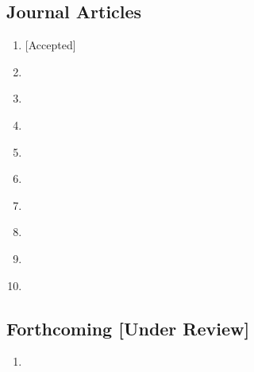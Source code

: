 \documentclass{my_cv}%
\begin{document}
\subsection{\faFileTextO \hspace{0.5em}\bfseries Journal Articles}
\vspace{1em}
\begin{enumerate}
\setlength\itemsep{-0.1em}
\color{mygray}
 \item {} [Accepted]\cite{Surendra2020}
 \item {} \cite{Sreedhar2020}
 \item {} \cite{Saini2020}
 \item {} \cite{puthiyaveettil2020}
 \item {} \cite{Nithin2019}
 \item {} \cite{maierhofer2018}
 \item {} \cite{unnikrishnakurup2017}
 \item {} \cite{thomas2017}
 \item {} \cite{sreedhar2016}
 \item {} \cite{sreedhar2012}
\end{enumerate}

\subsection{\faFileTextO \hspace{0.5em}\bfseries Forthcoming [Under Review]}
\vspace{1em}
\begin{enumerate}
\setlength\itemsep{-0.1em}
\color{mygray}
 \item {} \cite{Dhruv2020}
\end{enumerate}
\end{document}
